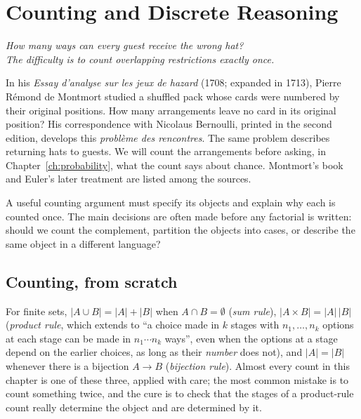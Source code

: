 \chapter{Counting and Discrete Reasoning}\label{ch:counting}

\begin{center}\itshape
How many ways can every guest receive the wrong hat?\\
The difficulty is to count overlapping restrictions exactly once.
\end{center}

In his \emph{Essay d'analyse sur les jeux de hazard} (1708; expanded in 1713), Pierre R\'emond de Montmort studied a shuffled pack whose cards were numbered by their original positions. How many arrangements leave no card in its original position? His correspondence with Nicolaus Bernoulli, printed in the second edition, develops this \emph{probl\`eme des rencontres}. The same problem describes returning hats to guests. We will count the arrangements before asking, in Chapter~\ref{ch:probability}, what the count says about chance. Montmort's book and Euler's later treatment are listed among the sources.

A useful counting argument must specify its objects and explain why each is counted once. The main decisions are often made before any factorial is written: should we count the complement, partition the objects into cases, or describe the same object in a different language?

\section{Counting, from scratch}

\begin{reminder}
For finite sets, $|A\cup B|=|A|+|B|$ when $A\cap B=\emptyset$ (\emph{sum rule}), $|A\times B|=|A|\,|B|$ (\emph{product rule}, which extends to ``a choice made in $k$ stages with $n_1,\dots,n_k$ options at each stage can be made in $n_1\cdots n_k$ ways'', even when the options at a stage depend on the earlier choices, as long as their \emph{number} does not), and $|A|=|B|$ whenever there is a bijection $A\to B$ (\emph{bijection rule}). Almost every count in this chapter is one of these three, applied with care; the most common mistake is to count something twice, and the cure is to check that the stages of a product-rule count really determine the object and are determined by it.
\end{reminder}

